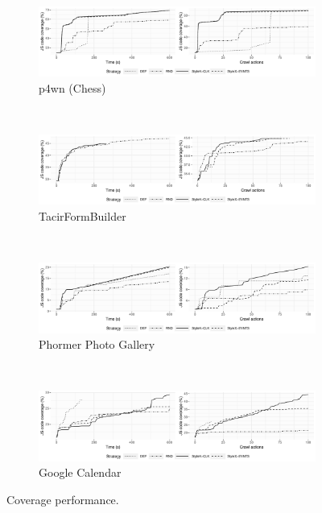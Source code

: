 \begin{figure}
	\centering
	\begin{subfigure}[b]{\linewidth}
		\centering
		\includegraphics[width=\linewidth, trim={0 1.25cm 0 0}, clip]{figures/chess-coverage}
		\vspace{-6mm}
		\caption{p4wn (Chess)}
		\label{fig:coverage-chess}
	\end{subfigure}\\[8pt]
	\begin{subfigure}[b]{\linewidth}
		\centering
		\includegraphics[width=\linewidth, trim={0 1.25cm 0 0}, clip]{figures/formbuilder-coverage}
		\vspace{-6mm}
		\caption{TacirFormBuilder}
		\label{fig:coverage-formbuilder}
	\end{subfigure}\\[8pt]
	\begin{subfigure}[b]{\linewidth}
		\centering
		\includegraphics[width=\linewidth, trim={0 1.25cm 0 0}, clip]{figures/phormer-coverage}
		\vspace{-6mm}
		\caption{Phormer Photo Gallery}
		\label{fig:coverage-phormer}
	\end{subfigure}\\[8pt]
	\begin{subfigure}[b]{\linewidth}
		\centering
		\includegraphics[width=\linewidth]{figures/calendar-coverage}
		\vspace{-4mm}
		\caption{Google Calendar}
		\label{fig:coverage-calendar}
	\end{subfigure}
	\caption{Coverage performance.}
	\label{fig:coverage-results}
\end{figure}


